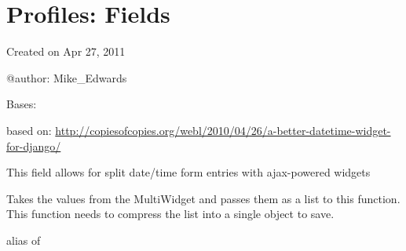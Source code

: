 \documentclass[letterpaper,10pt,english]{sphinxmanual}
\begin{document}

\begin{fulllineitems}
\label{generated/apps.profiles.views:apps.profiles.views.wordpress}
\end{fulllineitems}



\chapter{Profiles: Fields}
\label{generated/apps.profiles.fields:profiles-fields}\label{generated/apps.profiles.fields::doc}\label{generated/apps.profiles.fields:module-apps.profiles.fields}
Created on Apr 27, 2011

@author: Mike\_Edwards


\begin{fulllineitems}
\label{generated/apps.profiles.fields:apps.profiles.fields.DataMyneSplitDateTimeField}
Bases: 

based on: \href{http://copiesofcopies.org/webl/2010/04/26/a-better-datetime-widget-for-django/}{http://copiesofcopies.org/webl/2010/04/26/a-better-datetime-widget-for-django/}

This field allows for split date/time form entries with ajax-powered widgets


\begin{fulllineitems}
\label{generated/apps.profiles.fields:apps.profiles.fields.DataMyneSplitDateTimeField.compress}
Takes the values from the MultiWidget and passes them as a
list to this function. This function needs to compress the
list into a single object to save.

\end{fulllineitems}



\begin{fulllineitems}
\label{generated/apps.profiles.fields:apps.profiles.fields.DataMyneSplitDateTimeField.widget}
alias of 

\end{fulllineitems}


\end{fulllineitems}
\end{document}

